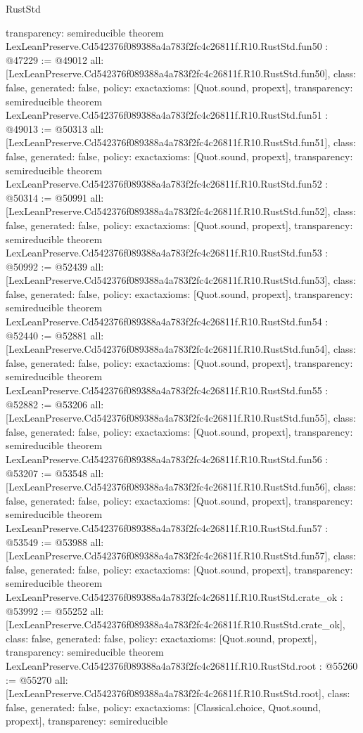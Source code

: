 \begin{lexlean}{RustStd}
\begin{coremodule}
{  transparency: semireducible
}
theorem LexLeanPreserve.Cd542376f089388a4a783f2fc4c26811f.R10.RustStd.fun50 : @47229 := @49012 {
  all: [LexLeanPreserve.Cd542376f089388a4a783f2fc4c26811f.R10.RustStd.fun50],
  class: false,
  generated: false,
  policy: exact{axioms: [Quot.sound, propext]},
  transparency: semireducible
}
theorem LexLeanPreserve.Cd542376f089388a4a783f2fc4c26811f.R10.RustStd.fun51 : @49013 := @50313 {
  all: [LexLeanPreserve.Cd542376f089388a4a783f2fc4c26811f.R10.RustStd.fun51],
  class: false,
  generated: false,
  policy: exact{axioms: [Quot.sound, propext]},
  transparency: semireducible
}
theorem LexLeanPreserve.Cd542376f089388a4a783f2fc4c26811f.R10.RustStd.fun52 : @50314 := @50991 {
  all: [LexLeanPreserve.Cd542376f089388a4a783f2fc4c26811f.R10.RustStd.fun52],
  class: false,
  generated: false,
  policy: exact{axioms: [Quot.sound, propext]},
  transparency: semireducible
}
theorem LexLeanPreserve.Cd542376f089388a4a783f2fc4c26811f.R10.RustStd.fun53 : @50992 := @52439 {
  all: [LexLeanPreserve.Cd542376f089388a4a783f2fc4c26811f.R10.RustStd.fun53],
  class: false,
  generated: false,
  policy: exact{axioms: [Quot.sound, propext]},
  transparency: semireducible
}
theorem LexLeanPreserve.Cd542376f089388a4a783f2fc4c26811f.R10.RustStd.fun54 : @52440 := @52881 {
  all: [LexLeanPreserve.Cd542376f089388a4a783f2fc4c26811f.R10.RustStd.fun54],
  class: false,
  generated: false,
  policy: exact{axioms: [Quot.sound, propext]},
  transparency: semireducible
}
theorem LexLeanPreserve.Cd542376f089388a4a783f2fc4c26811f.R10.RustStd.fun55 : @52882 := @53206 {
  all: [LexLeanPreserve.Cd542376f089388a4a783f2fc4c26811f.R10.RustStd.fun55],
  class: false,
  generated: false,
  policy: exact{axioms: [Quot.sound, propext]},
  transparency: semireducible
}
theorem LexLeanPreserve.Cd542376f089388a4a783f2fc4c26811f.R10.RustStd.fun56 : @53207 := @53548 {
  all: [LexLeanPreserve.Cd542376f089388a4a783f2fc4c26811f.R10.RustStd.fun56],
  class: false,
  generated: false,
  policy: exact{axioms: [Quot.sound, propext]},
  transparency: semireducible
}
theorem LexLeanPreserve.Cd542376f089388a4a783f2fc4c26811f.R10.RustStd.fun57 : @53549 := @53988 {
  all: [LexLeanPreserve.Cd542376f089388a4a783f2fc4c26811f.R10.RustStd.fun57],
  class: false,
  generated: false,
  policy: exact{axioms: [Quot.sound, propext]},
  transparency: semireducible
}
theorem LexLeanPreserve.Cd542376f089388a4a783f2fc4c26811f.R10.RustStd.crate_ok : @53992 := @55252 {
  all: [LexLeanPreserve.Cd542376f089388a4a783f2fc4c26811f.R10.RustStd.crate_ok],
  class: false,
  generated: false,
  policy: exact{axioms: [Quot.sound, propext]},
  transparency: semireducible
}
theorem LexLeanPreserve.Cd542376f089388a4a783f2fc4c26811f.R10.RustStd.root : @55260 := @55270 {
  all: [LexLeanPreserve.Cd542376f089388a4a783f2fc4c26811f.R10.RustStd.root],
  class: false,
  generated: false,
  policy: exact{axioms: [Classical.choice, Quot.sound, propext]},
  transparency: semireducible
}


\end{coremodule}
\end{lexlean}
